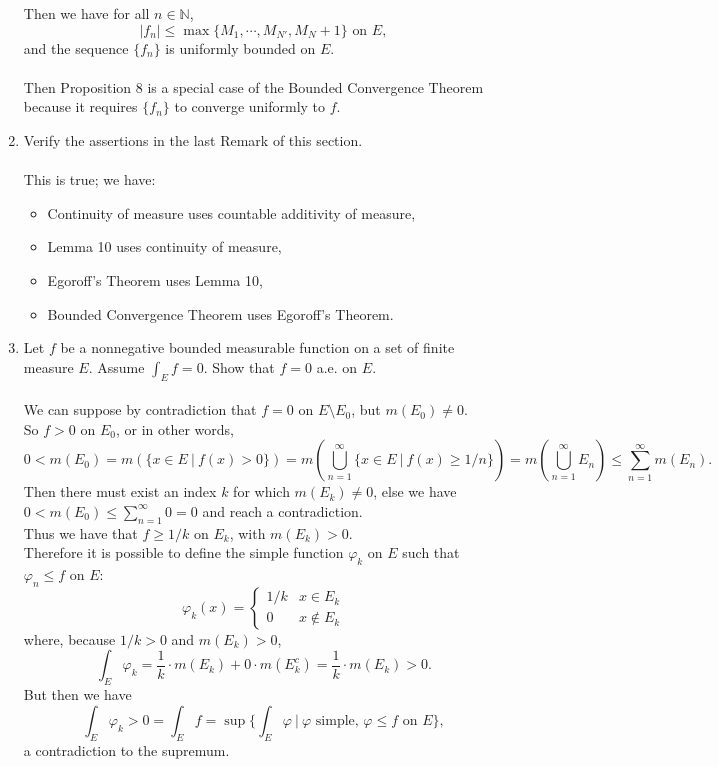 \begin{enumerate}
\[    \]
    Then we have for all $n\in\mathbb{N}$,
    \[
        |f_n|\le\max\{M_1,\cdots,M_{N'},M_N+1\}\text{ on }E,
    \]
    and the sequence $\{f_n\}$ is uniformly bounded on $E$.\\
    \\Then Proposition 8 is a special case of the Bounded Convergence Theorem because it requires $\{f_n\}$ to converge uniformly to $f$.
    \item Verify the assertions in the last Remark of this section.\\
    \\This is true; we have:
    \begin{itemize}
        \item Continuity of measure uses countable additivity of measure,
        \item Lemma 10 uses continuity of measure,
        \item Egoroff's Theorem uses Lemma 10,
        \item Bounded Convergence Theorem uses Egoroff's Theorem.
    \end{itemize}
    \item Let $f$ be a nonnegative bounded measurable function on a set of finite measure $E$. Assume $\int_Ef=0$. Show that $f=0$ a.e. on $E$.\\
    \\We can suppose by contradiction that $f=0$ on $E\setminus E_0$, but $m(E_0)\neq0$.
    \\So $f>0$ on $E_0$, or in other words, 
    \[
        0<m(E_0)=m(\{x\in E\ |\ f(x)>0\})=m(\bigcup_{n=1}^\infty\{x\in E\ |\ f(x)\ge1/n\})=m(\bigcup_{n=1}^\infty E_n)\le \sum_{n=1}^\infty m(E_n).
    \]
    Then there must exist an index $k$ for which $m(E_k)\neq0$, else we have $0<m(E_0)\le\sum_{n=1}^\infty 0=0$ and reach a contradiction.
    \\Thus we have that $f\ge 1/k$ on $E_k$, with $m(E_k)>0$.
    \\Therefore it is possible to define the simple function $\varphi_k$ on $E$ such that $\varphi_n \le f$ on $E$:
    \[
        \varphi_k(x)=
        \begin{cases}
            1/k&x\in E_k\\
            0&x\notin E_k
        \end{cases}    
    \]
    where, because $1/k>0$ and $m(E_k)>0$, 
    \[
        \int_E\varphi_k=\frac{1}{k}\cdot m(E_k)+0\cdot m(E_k^c)=\frac{1}{k}\cdot m(E_k)>0.
    \]
    But then we have
    \[
        \int_E\varphi_k>0=\int_Ef=\sup\biggl\{\int_E\varphi\ |\ \varphi\text{ simple, }\varphi\le f\text{ on }E\biggr\},
    \]
    a contradiction to the supremum.
\end{enumerate}

